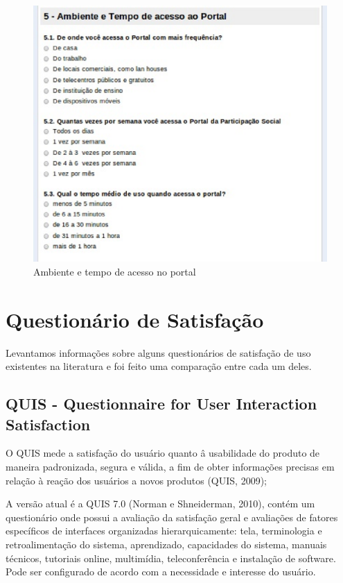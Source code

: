 \begin{figure}[!h]
    \centering
    \includegraphics[keepaspectratio=true,scale=0.60]
      {figuras/perf6.eps}
    \caption{Ambiente e tempo de acesso no portal}
    \label{acessoportal}
\end{figure}

\section{Questionário de Satisfação}

	Levantamos informações sobre alguns questionários de satisfação de uso existentes na literatura e foi feito uma comparação entre cada um deles.

\subsection{QUIS - Questionnaire for User Interaction Satisfaction}

	O QUIS mede a satisfação do usuário quanto â usabilidade do produto de maneira padronizada, segura e válida, a fim de obter informações precisas em relação à reação dos usuários a novos produtos (QUIS, 2009);

	A versão atual é a QUIS 7.0 (Norman e Shneiderman, 2010), contém um questionário onde possui a avaliação da satisfação geral e avaliações de fatores específicos de interfaces organizadas hierarquicamente: tela, terminologia e retroalimentação do sistema, aprendizado, capacidades do sistema, manuais técnicos, tutoriais online, multimídia, teleconferência e instalação de software. Pode ser configurado de acordo com a necessidade e interesse do usuário. 

